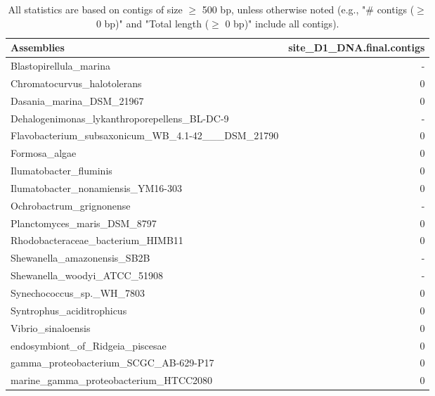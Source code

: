 \documentclass[12pt,a4paper]{article}
\begin{document}
\begin{table}[ht]
\begin{center}
\caption{All statistics are based on contigs of size $\geq$ 500 bp, unless otherwise noted (e.g., "\# contigs ($\geq$ 0 bp)" and "Total length ($\geq$ 0 bp)" include all contigs).}
\begin{tabular}{|l*{1}{|r}|}
\hline
Assemblies & site\_D1\_DNA.final.contigs \\ \hline
Blastopirellula\_marina & - \\ \hline
Chromatocurvus\_halotolerans & 0 \\ \hline
Dasania\_marina\_DSM\_21967 & 0 \\ \hline
Dehalogenimonas\_lykanthroporepellens\_BL-DC-9 & - \\ \hline
Flavobacterium\_subsaxonicum\_WB\_4.1-42\_\_\_DSM\_21790 & 0 \\ \hline
Formosa\_algae & 0 \\ \hline
Ilumatobacter\_fluminis & 0 \\ \hline
Ilumatobacter\_nonamiensis\_YM16-303 & 0 \\ \hline
Ochrobactrum\_grignonense & - \\ \hline
Planctomyces\_maris\_DSM\_8797 & 0 \\ \hline
Rhodobacteraceae\_bacterium\_HIMB11 & 0 \\ \hline
Shewanella\_amazonensis\_SB2B & - \\ \hline
Shewanella\_woodyi\_ATCC\_51908 & - \\ \hline
Synechococcus\_sp.\_WH\_7803 & 0 \\ \hline
Syntrophus\_aciditrophicus & 0 \\ \hline
Vibrio\_sinaloensis & 0 \\ \hline
endosymbiont\_of\_Ridgeia\_piscesae & 0 \\ \hline
gamma\_proteobacterium\_SCGC\_AB-629-P17 & 0 \\ \hline
marine\_gamma\_proteobacterium\_HTCC2080 & 0 \\ \hline
\end{tabular}
\end{center}
\end{table}
\end{document}
